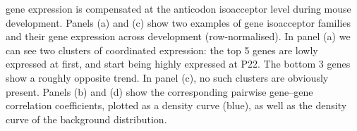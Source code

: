     {\trna gene expression is compensated at the anticodon isoacceptor level
    during mouse development.}
    {Panels (a) and (c) show two examples of \trna gene isoacceptor families and
    their gene expression across development (row-normalised). In panel (a) we
    can see two clusters of coordinated expression: the top \num{5} genes are
    lowly expressed at first, and start being highly expressed at P22. The
    bottom \num{3} genes show a roughly opposite trend. In panel (c), no such
    clusters are obviously present. Panels (b) and (d) show the corresponding
    pairwise gene--gene correlation coefficients, plotted as a density curve
    (blue), as well as the density curve of the background distribution.}


